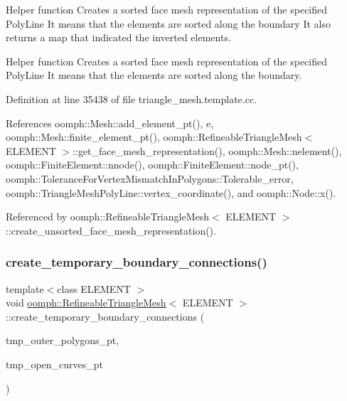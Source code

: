 Helper function Creates a sorted face mesh representation of the specified Poly\+Line It means that the elements are sorted along the boundary It also returns a map that indicated the inverted elements. 

Helper function Creates a sorted face mesh representation of the specified Poly\+Line It means that the elements are sorted along the boundary. 

Definition at line 35438 of file triangle\+\_\+mesh.\+template.\+cc.



References oomph\+::\+Mesh\+::add\+\_\+element\+\_\+pt(), e, oomph\+::\+Mesh\+::finite\+\_\+element\+\_\+pt(), oomph\+::\+Refineable\+Triangle\+Mesh$<$ E\+L\+E\+M\+E\+N\+T $>$\+::get\+\_\+face\+\_\+mesh\+\_\+representation(), oomph\+::\+Mesh\+::nelement(), oomph\+::\+Finite\+Element\+::nnode(), oomph\+::\+Finite\+Element\+::node\+\_\+pt(), oomph\+::\+Tolerance\+For\+Vertex\+Mismatch\+In\+Polygons\+::\+Tolerable\+\_\+error, oomph\+::\+Triangle\+Mesh\+Poly\+Line\+::vertex\+\_\+coordinate(), and oomph\+::\+Node\+::x().



Referenced by oomph\+::\+Refineable\+Triangle\+Mesh$<$ E\+L\+E\+M\+E\+N\+T $>$\+::create\+\_\+unsorted\+\_\+face\+\_\+mesh\+\_\+representation().

\mbox{\label{classoomph_1_1RefineableTriangleMesh_aa0d2608c4671777754eb84c5083c9fcb}} 
\subsubsection{\texorpdfstring{create\+\_\+temporary\+\_\+boundary\+\_\+connections()}{create\_temporary\_boundary\_connections()}}
{\footnotesize\ttfamily template$<$class E\+L\+E\+M\+E\+NT $>$ \\
void \hyperlink{classoomph_1_1RefineableTriangleMesh}{oomph\+::\+Refineable\+Triangle\+Mesh}$<$ E\+L\+E\+M\+E\+NT $>$\+::create\+\_\+temporary\+\_\+boundary\+\_\+connections (\begin{DoxyParamCaption}\item[{\hyperlink{classoomph_1_1Vector}{Vector}$<$ \hyperlink{classoomph_1_1TriangleMeshPolygon}{Triangle\+Mesh\+Polygon} $\ast$$>$ \&}]{tmp\+\_\+outer\+\_\+polygons\+\_\+pt,  }\item[{\hyperlink{classoomph_1_1Vector}{Vector}$<$ \hyperlink{classoomph_1_1TriangleMeshOpenCurve}{Triangle\+Mesh\+Open\+Curve} $\ast$$>$ \&}]{tmp\+\_\+open\+\_\+curves\+\_\+pt }\end{DoxyParamCaption})\hspace{0.3cm}{\ttfamily [protected]}}



